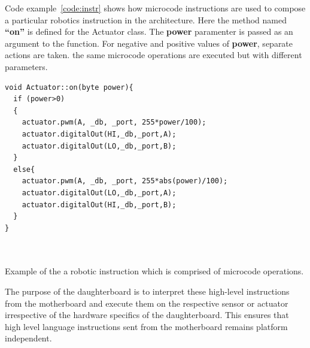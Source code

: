	Code example~\ref{code:instr} shows how microcode instructions are used to compose a particular robotics instruction in the \xten architecture. Here the method named \textbf{``on''} is defined for the Actuator class. The \textbf{power} paramenter is passed as an argument to the function. For negative and positive values of \textbf{power}, separate actions are taken. the same microcode operations are executed but with different parameters.
	\begin{listing}
		\footnotesize
		\label{code:instr}
		\begin{verbatim}
void Actuator::on(byte power){
  if (power>0)
  {
    actuator.pwm(A, _db, _port, 255*power/100);
    actuator.digitalOut(HI,_db,_port,A);
    actuator.digitalOut(LO,_db,_port,B);
  }
  else{
    actuator.pwm(A, _db, _port, 255*abs(power)/100);
    actuator.digitalOut(LO,_db,_port,A);
    actuator.digitalOut(HI,_db,_port,B);
  }
}
	
	
		\end{verbatim}
		\caption{Example of the a robotic instruction which is comprised of microcode operations.} 
	\end{listing}
	
	
	The purpose of the daughterboard is to interpret these high-level instructions from the motherboard and execute them on the respective sensor or actuator irrespective of the hardware specifics of the daughterboard. This ensures that high level language instructions sent from the motherboard remains platform independent.
	
	
	
